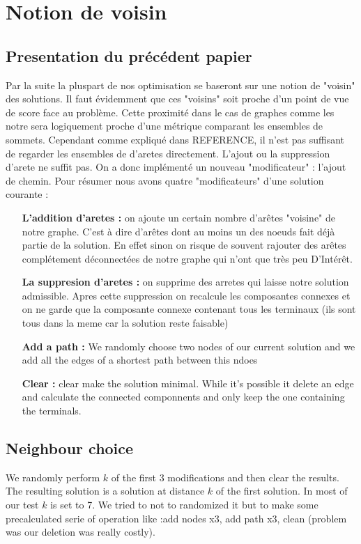 \documentclass[10pt,a4paper]{article}
\begin{document}
\section{Notion de voisin}



\subsection{Presentation du précédent papier}
Par la suite la pluspart de nos optimisation se baseront sur une notion de "voisin" des solutions. Il faut évidemment que ces "voisins" soit proche d'un point de vue de score face au problème. Cette proximité dans le cas de graphes comme les notre sera logiquement proche d'une métrique comparant les ensembles de sommets. Cependant comme expliqué dans REFERENCE, il n'est pas suffisant de regarder les ensembles de d'aretes directement. L'ajout ou la suppression d'arete ne suffit pas. On a donc implémenté un nouveau "modificateur" : l'ajout de chemin. 
Pour résumer nous avons quatre "modificateurs" d'une solution courante :
\begin{itemize} 
\item[\textbf{L'addition  d'aretes : }] on ajoute un certain nombre d'arêtes "voisine" de notre graphe. C'est à dire d'arêtes dont au moins un des noeuds fait déjà partie de la solution. En effet sinon on risque de souvent rajouter des arêtes complétement déconnectées de notre graphe qui n'ont que très peu D’Intérêt.
\item[\textbf{La suppresion d'aretes : }] on supprime des arretes qui laisse notre solution admissible. Apres cette suppression on recalcule les composantes connexes et on ne garde que la composante connexe contenant tous les terminaux (ils sont tous dans la meme car la solution reste faisable)
\item[\textbf{Add a path : }] We randomly choose two nodes of our current solution and we add all the edges of a shortest path between this ndoes
\item[\textbf{Clear : }] clear make the solution minimal. While it's possible it delete an edge and calculate the connected componnents and only keep the one containing the terminals.
\end{itemize}

\subsection{Neighbour choice}

We randomly perform $k$ of the first 3 modifications and then clear the results. The resulting solution is a solution at distance $k$ of the first solution. In most of our test $k$ is set to 7. We tried to not to randomized it but to make some precalculated serie of operation like :add nodes x3, add path x3, clean (problem was our deletion was really costly).
\end{document}
